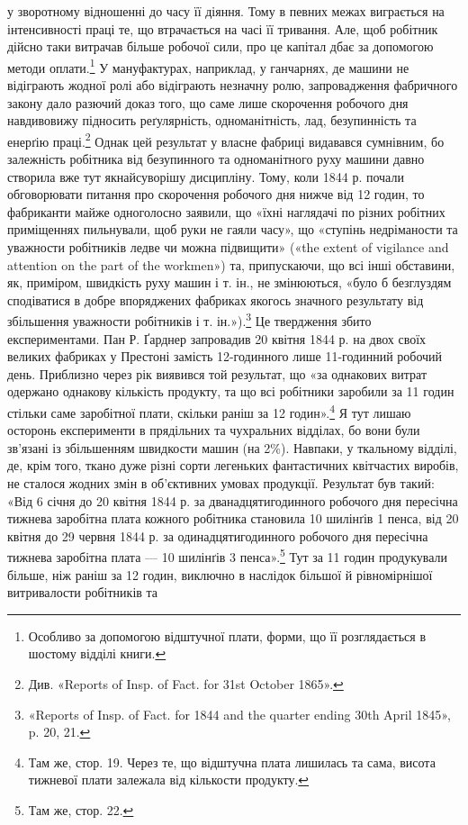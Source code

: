 \parcont{}  %
у зворотному відношенні до часу її діяння. Тому в певних межах
виграється на інтенсивності праці те, що втрачається на часі її
тривання. Але, щоб робітник дійсно таки витрачав більше робочої
сили, про це капітал дбає за допомогою методи оплати.\footnote{
Особливо за допомогою відштучної плати, форми, що її розглядається
в шостому відділі книги.
} У мануфактурах,
наприклад, у ганчарнях, де машини не відіграють
жодної ролі або відіграють незначну ролю, запровадження фабричного
закону дало разючий доказ того, що саме лише скорочення
робочого дня навдивовижу підносить реґулярність, одноманітність,
лад, безупинність та енерґію праці.\footnote{
Див. «Reports of Insp. of Fact. for 31st October 1865».
} Однак цей результат
у власне фабриці видавався сумнівним, бо залежність робітника
від безупинного та одноманітного руху машини давно створила
вже тут якнайсуворішу дисципліну. Тому, коли 1844 р.
почали обговорювати питання про скорочення робочого дня
нижче від 12 годин, то фабриканти майже одноголосно заявили,
що «їхні наглядачі по різних робітних приміщеннях пильнували,
щоб руки не гаяли часу», що «ступінь недріманости та уважности
робітників ледве чи можна підвищити» («the extent of vigilance
and attention on the part of the workmen») та, припускаючи, що всі
інші обставини, як, приміром, швидкість руху машин і т. ін.,
не змінюються, «було б безглуздям сподіватися в добре впоряджених
фабриках якогось значного результату від збільшення
уважности робітників і т. ін.»).\footnote{
«Reports of Insp. of Fact. for 1844 and the quarter ending 30th
April 1845», p. 20, 21.
} Це твердження збито експериментами.
Пан Р. Ґарднер запровадив 20 квітня 1844 р. на двох
своїх великих фабриках у Престоні замість 12-годинного лише
11-годинний робочий день. Приблизно через рік виявився
той результат, що «за однакових витрат одержано однакову
кількість продукту, та що всі робітники заробили за 11 годин
стільки саме заробітної плати, скільки раніш за 12 годин».\footnote{
Там же, стор. 19. Через те, що відштучна плата лишилась та
сама, висота тижневої плати залежала від кількости продукту.
}
Я тут лишаю осторонь експерименти в прядільних та чухральних
відділах, бо вони були зв’язані із збільшенням швидкости машин
(на 2\%). Навпаки, у ткальному відділі, де, крім того, ткано
дуже різні сорти легеньких фантастичних квітчастих виробів,
не сталося жодних змін в об’єктивних умовах продукції. Результат
був такий: «Від 6 січня до 20 квітня 1844 р. за дванадцятигодинного
робочого дня пересічна тижнева заробітна плата кожного
робітника становила 10 шилінґів 1 пенса, від 20 квітня до
29 червня 1844 р. за одинадцятигодинного робочого дня пересічна
тижнева заробітна плата — 10 шилінґів 3 пенса».\footnote{
Там же, стор. 22.
} Тут за
11 годин продукували більше, ніж раніш за 12 годин, виключно
в наслідок більшої й рівномірнішої витривалости робітників та
\parbreak{}  %
